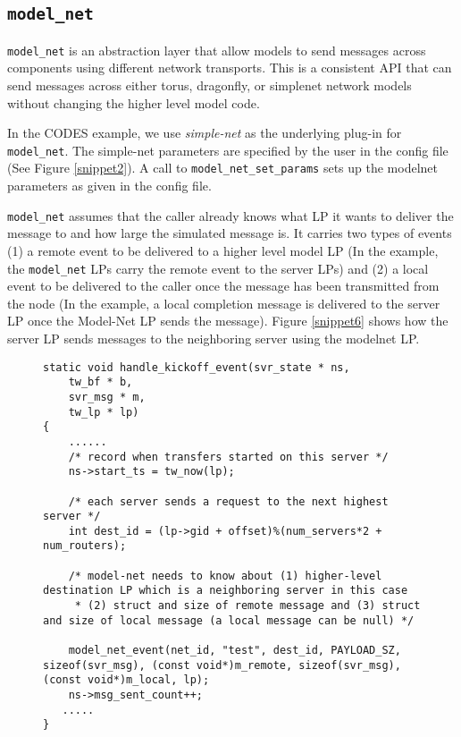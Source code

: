 \documentclass[conference,10pt,compsocconf,onecolumn]{IEEEtran}
\newcommand{\codesmodelnet}[1]{\texttt{model\_net}}
\begin{document}
\subsection{\codesmodelnet{}}
\codesmodelnet{} is an abstraction layer that allow models to send messages
across components using different network transports. This is a
consistent API that can send messages across either torus, dragonfly, or
simplenet network models without changing the higher level model code.

In the CODES example, we use \emph{simple-net} as the underlying plug-in for
\codesmodelnet{}. The simple-net parameters are specified by the user in the config
file (See Figure \ref{snippet2}). A call to \texttt{model\_net\_set\_params} sets up
the model\-net parameters as given in the config file.

\codesmodelnet{} assumes that the caller already knows what LP it wants to
deliver the message to and how large the simulated message is. It carries two
types of events (1) a remote event to be delivered to a higher level model LP
(In the example, the \codesmodelnet{} LPs carry the remote event to the server LPs) and
(2) a local event to be delivered to the caller once the message has been
transmitted from the node (In the example, a local completion message is
delivered to the server LP once the Model-Net LP sends the message). Figure
\ref{snippet6} shows how the server LP sends messages to the neighboring server
using the model\-net LP. 

\begin{figure}
\begin{lstlisting}[caption=Example code snippet showing data transfer through model-net API, label=snippet6]
static void handle_kickoff_event(svr_state * ns,
    tw_bf * b,
    svr_msg * m,
    tw_lp * lp)
{
    ......
    /* record when transfers started on this server */
    ns->start_ts = tw_now(lp);

    /* each server sends a request to the next highest server */
    int dest_id = (lp->gid + offset)%(num_servers*2 + num_routers);

    /* model-net needs to know about (1) higher-level destination LP which is a neighboring server in this case
     * (2) struct and size of remote message and (3) struct and size of local message (a local message can be null) */
    
    model_net_event(net_id, "test", dest_id, PAYLOAD_SZ, sizeof(svr_msg), (const void*)m_remote, sizeof(svr_msg), (const void*)m_local, lp);
    ns->msg_sent_count++;
   .....
}

\end{lstlisting}
\end{figure}
 
\end{document}
